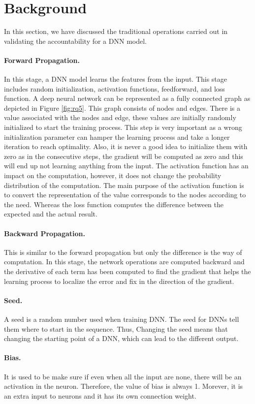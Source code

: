 \section{Background}
\label{sec:background}
In this section, we have discussed the traditional operations carried out in validating the accountability for a DNN model.
\paragraph{Forward Propagation.} In this stage, a DNN model learns the features from the input. This stage includes random initialization, activation functions, feedforward, and loss function. A deep neural network can be represented as a fully connected graph as depicted in Figure \ref{fig:rq5}. This graph consists of nodes and edges. There is a value associated with the nodes and edge, these values are initially randomly initialized to start the training process. This step is very important as a wrong initialization parameter can hamper the learning process and take a longer iteration to reach optimality. Also, it is never a good idea to initialize them with zero as in the consecutive steps, the gradient will be computed as zero and this will end up not learning anything from the input. The activation function has an impact on the computation, however, it does not change the probability distribution of the computation. The main purpose of the activation function is to convert the representation of the value corresponds to the nodes according to the need. Whereas the loss function computes the difference between the expected and the actual result.
\paragraph{Backward Propagation.} This is similar to the forward propagation but only the difference is the way of computation. In this stage, the network operations are computed backward and the derivative of each term has been computed to find the gradient that helps the learning process to localize the error and fix in the direction of the gradient.
\paragraph{Seed.} A seed is a random number used when training DNN. The seed for DNNs tell them where to start in the sequence. Thus, Changing the seed means that changing the starting point of a DNN, which can lead to the different output.
\paragraph{Bias.} It is used to be make sure if even when all the input are none, there will be an activation in the neuron. Therefore, the value of bias is always 1. Morever, it is an extra input to neurons and it has its own connection weight. 
